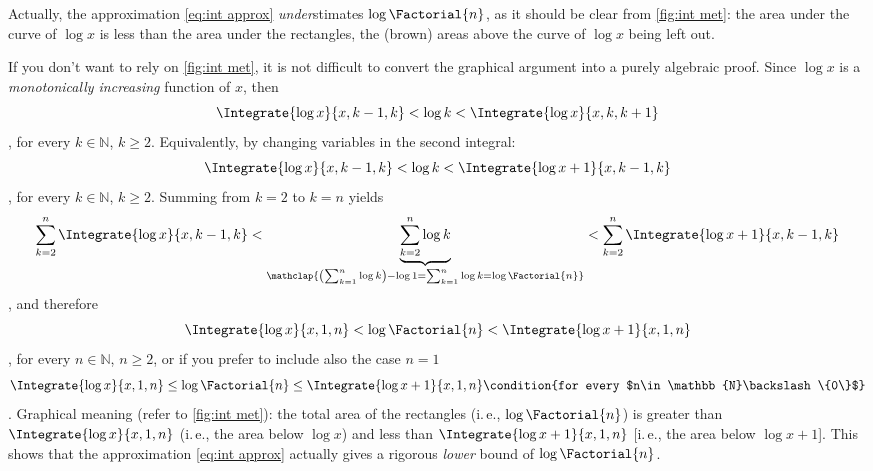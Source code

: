 \documentclass[onecolumn,a4paper,11pt]{article}
\newenvironment{approfondimento}%
  {\begin{quoting}\small\ignorespaces}%
  {\end{quoting}}
\providecommand{\ie}{i.\,e.}
\newcommand{\numberset}{\mathbb}
\providecommand{\N}{\numberset{N}}
\theoremstyle{classicdef}
\theoremstyle{remark}
\begin{document}
Actually, the approximation  \cref{eq:int approx} \emph{under}stimates $\log
{\Factorial{n}}$, as it 
should be 
clear from \cref{fig:int met}: the area under the
curve of $\log x$ 
is less than the area under the rectangles, the (brown) areas above
the curve of $\log x$  being left out. 

\begin{approfondimento}
   If you don't want to rely on \cref{fig:int met}, it is not difficult to
   convert the graphical argument into a purely algebraic proof.
Since $\log x$ is a \emph{monotonically 
   increasing} function of $x$, then 
\begin{dmath*}[compact]
   \Integrate{\log x}{x,k-1,k} < \log k < \Integrate{\log x}{x, k, k+1}
\end{dmath*},
for every $k\in\N$, $k\geq 2$.
Equivalently, by changing variables in the second integral:
\begin{dmath*}[compact]
   \Integrate{\log x}{x,k-1,k} < \log k < \Integrate{\log{x+1}}{x, k-1, k}
\end{dmath*},
for every $k\in\N$, $k\geq 2$.
Summing from $k=2$ to $k=n$ yields
\begin{dmath*}[compact]
\sum_{k=2}^{n} 
   \Integrate{\log x}{x,k-1,k}  <
\underbrace{%
\sum_{k=2}^{n}\log k
}_{\mathclap{\left( \sum_{k=1}^{n} \log k\right) - \log 1 %
      = \sum_{k=1}^{n} \log k = \log {\Factorial{n}}  }  }
<
\sum_{k=2}^{n} 
\Integrate{\log{x+1}}{x, k-1, k}
\end{dmath*}, 
and therefore
\begin{dmath*}[compact]
   \Integrate{\log x }{x,1,n} < \log {\Factorial{n}} <
   \Integrate{\log{x+1}}{x,1,n}
\end{dmath*},
for every $n\in\N$, $n\geq 2$,
or if you prefer to include also the case $n=1$
\begin{dmath*}[compact]
   \Integrate{\log x }{x,1,n} \leq \log{\Factorial{n}}\leq 
   \Integrate{\log{x+1}}{x,1,n}
   \condition{for every $n\in\N \backslash\{0\}$}
\end{dmath*}.
Graphical meaning (refer to \cref{fig:int met}):
the total area of the rectangles
(\ie, $\log{\Factorial{n}}$) is greater than $\Integrate{\log x}{x,1,n}$
(\ie, the area below $\log x$)  and less than
$\Integrate{\log{x+1}}{x,1,n}$ [\ie, the area below $\log {x+1}$].
This shows that the approximation \cref{eq:int approx} actually gives a
rigorous \emph{lower} bound of $\log{\Factorial{n}}$.
\end{approfondimento}
\end{document}

